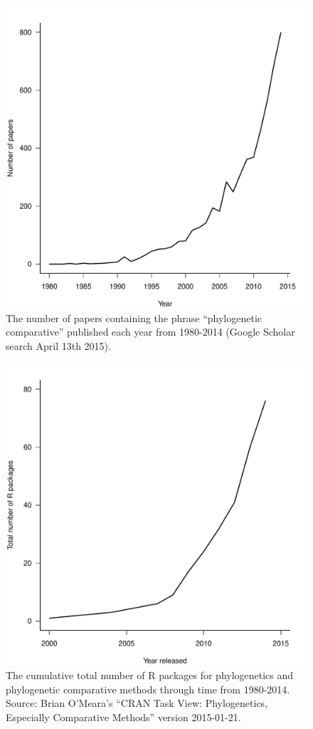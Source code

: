 \documentclass[a4paper,12pt]{article}
\begin{document}
  \begin{figure}[!htbp]
    \centering
      \includegraphics[width=12cm]{Figures/PCMCitations.pdf}
      \caption{The number of papers containing the phrase ``phylogenetic comparative'' published each year from 1980-2014 (Google Scholar search April 13th 2015).}
      \label{PCMCitations}
  \end{figure}

\newpage
  \begin{figure}[!htbp]
    \centering
      \includegraphics[width=12cm]{Figures/PCMRpackages.pdf}
      \caption{The cumulative total number of R packages for phylogenetics and phylogenetic comparative methods through time from 1980-2014. Source: Brian O'Meara's ``CRAN Task View: Phylogenetics, Especially Comparative Methods'' version 2015-01-21.}
      \label{PCMRpackages}
  \end{figure}
\end{document}
